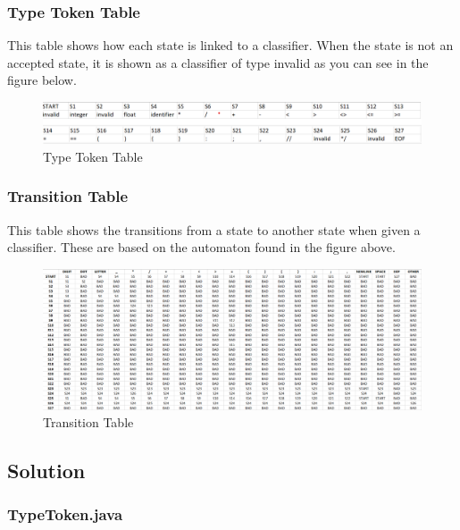\documentclass{article}
\begin{document}
				\subsubsection{Type Token Table}
				This table shows how each state is linked to a classifier. When the state is not an accepted state, it is shown as a classifier of type invalid as you can see in the figure below.
				
					\begin{center}
					\begin{figure}[H]
			 			\includegraphics[width=\textwidth]{table2.png}
			  			\caption{Type Token Table}
			  			\label{fig:tokentable}
					\end{figure}
				\end{center}
				
				\subsubsection{Transition Table}
				This table shows the transitions from a state to another state when given a classifier. These are based on the automaton found in the figure above. 
				
					\begin{center}
					\begin{figure}[h!]
			 			\includegraphics[width=\textwidth]{table.png}
			  			\caption{Transition Table}
			  			\label{fig:transiitontable}
					\end{figure}
				\end{center}	
				
					\subsection{Solution}
					
					
					\subsubsection{TypeToken.java}
					
\end{document}
